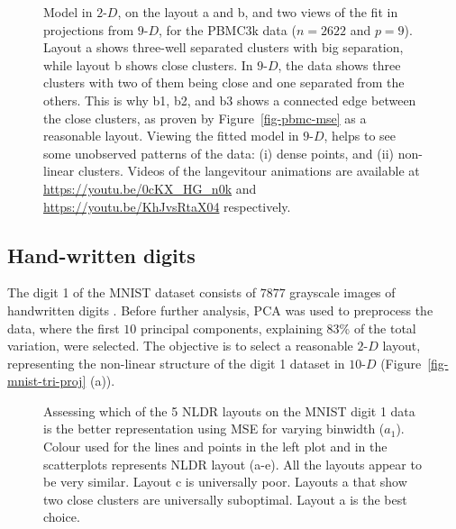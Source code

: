\documentclass[
  12pt]{article}
\newcommand\gD{$2\text{-}D$}
\begin{document}
\begin{figure}[H]


\caption{\label{fig-model-pbmc-author-proj}Model in \gD{}, on the layout
a and b, and two views of the fit in projections from \(9\text{-}D\),
for the PBMC3k data (\(n =  2622\) and \(p = 9\)). Layout a shows
three-well separated clusters with big separation, while layout b shows
close clusters. In \(9\text{-}D\), the data shows three clusters with
two of them being close and one separated from the others. This is why
b1, b2, and b3 shows a connected edge between the close clusters, as
proven by Figure~\ref{fig-pbmc-mse} as a reasonable layout. Viewing the
fitted model in \(9\text{-}D\), helps to see some unobserved patterns of
the data: (i) dense points, and (ii) non-linear clusters. Videos of the
langevitour animations are available at
\url{https://youtu.be/0cKX_HG_n0k} and
\url{https://youtu.be/KhJvsRtaX04} respectively.}

\end{figure}%

\subsection{Hand-written digits}\label{hand-written-digits}

The digit 1 of the MNIST dataset consists of \(7877\) grayscale images
of handwritten digits \citep{lecun2010}. Before further analysis, PCA
was used to preprocess the data, where the first \(10\) principal
components, explaining 83\% of the total variation, were selected. The
objective is to select a reasonable \gD{} layout, representing the
non-linear structure of the digit 1 dataset in \(10\text{-}D\)
(Figure~\ref{fig-mnist-tri-proj} (a)).

\begin{figure}[H]


\caption{\label{fig-mnist-mse}Assessing which of the 5 NLDR layouts on
the MNIST digit 1 data is the better representation using MSE for
varying binwidth (\(a_1\)). Colour used for the lines and points in the
left plot and in the scatterplots represents NLDR layout (a-e). All the
layouts appear to be very similar. Layout c is universally poor. Layouts
a that show two close clusters are universally suboptimal. Layout a is
the best choice.}

\end{figure}%
\end{document}
